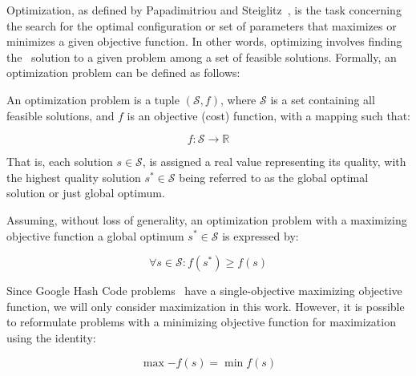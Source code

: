 Optimization, as defined by Papadimitriou and
Steiglitz~\cite{papadimitriou1998combinatorial}, is the task concerning the
search for the optimal configuration or set of parameters that maximizes or
minimizes a given objective function. In other words, optimizing involves
finding the~ solution to a given problem among a set of feasible
solutions. Formally, an optimization problem can be defined as follows:

\begin{definition}
  \label{def:optimization-problem}
  An optimization problem is a tuple $(\mathcal{S}, f)$, where
  $\mathcal{S}$ is a set containing all feasible solutions, and $f$ is an
  objective (cost) function, with a mapping such that:

  \begin{equation}
    \label{eq:optimization-problem}
    f \colon \mathcal{S} \longrightarrow \mathbb{R}
  \end{equation}

  That is, each solution $s \in \mathcal{S}$, is assigned a real value
  representing its quality, with the highest quality solution $s^{*} \in
    \mathcal{S}$ being referred to as the global optimal solution or just global optimum.
\end{definition}

\begin{definition}
  \label{def:global-optimum}
  Assuming, without loss of generality, an optimization problem with a maximizing
  objective function a global optimum $s^* \in \mathcal{S}$ is expressed by:

  \begin{equation}
    \forall s \in \mathcal{S} \colon f(s^{*}) \geq f(s)
  \end{equation}

\end{definition}

Since Google Hash Code problems~\cite{googlellc2023codingcompetitionsarchive}
have a single-objective maximizing objective function, we will only consider
maximization in this work. However, it is possible to reformulate problems with
a minimizing objective function for maximization~\cite{nocedal2006numerical}
using the identity:

\begin{equation}
  \label{eq:max2min}
  \max{-f(s)} = \min{f(s)}
\end{equation}


